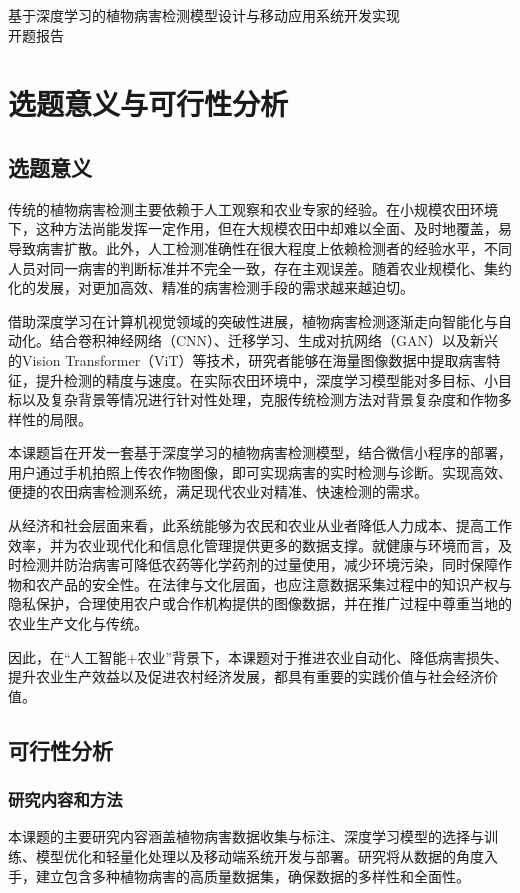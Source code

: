 \begin{center}
    \heiti {}基于深度学习的植物病害检测模型设计与移动应用系统开发实现\\
    开题报告
\end{center}
\songti {}
\section{选题意义与可行性分析}
\subsection{选题意义}
传统的植物病害检测主要依赖于人工观察和农业专家的经验。在小规模农田环境下，这种方法尚能发挥一定作用，但在大规模农田中却难以全面、及时地覆盖，易导致病害扩散。此外，人工检测准确性在很大程度上依赖检测者的经验水平，不同人员对同一病害的判断标准并不完全一致，存在主观误差。随着农业规模化、集约化的发展，对更加高效、精准的病害检测手段的需求越来越迫切。

借助深度学习在计算机视觉领域的突破性进展，植物病害检测逐渐走向智能化与自动化。结合卷积神经网络（CNN）、迁移学习、生成对抗网络（GAN）以及新兴的Vision Transformer（ViT）等技术，研究者能够在海量图像数据中提取病害特征，提升检测的精度与速度。在实际农田环境中，深度学习模型能对多目标、小目标以及复杂背景等情况进行针对性处理，克服传统检测方法对背景复杂度和作物多样性的局限。

本课题旨在开发一套基于深度学习的植物病害检测模型，结合微信小程序的部署，用户通过手机拍照上传农作物图像，即可实现病害的实时检测与诊断。实现高效、便捷的农田病害检测系统，满足现代农业对精准、快速检测的需求。

从经济和社会层面来看，此系统能够为农民和农业从业者降低人力成本、提高工作效率，并为农业现代化和信息化管理提供更多的数据支撑。就健康与环境而言，及时检测并防治病害可降低农药等化学药剂的过量使用，减少环境污染，同时保障作物和农产品的安全性。在法律与文化层面，也应注意数据采集过程中的知识产权与隐私保护，合理使用农户或合作机构提供的图像数据，并在推广过程中尊重当地的农业生产文化与传统。

因此，在“人工智能+农业”背景下，本课题对于推进农业自动化、降低病害损失、提升农业生产效益以及促进农村经济发展，都具有重要的实践价值与社会经济价值。

\subsection{可行性分析}
\subsubsection{研究内容和方法}
本课题的主要研究内容涵盖植物病害数据收集与标注、深度学习模型的选择与训练、模型优化和轻量化处理以及移动端系统开发与部署。研究将从数据的角度入手，建立包含多种植物病害的高质量数据集，确保数据的多样性和全面性。

